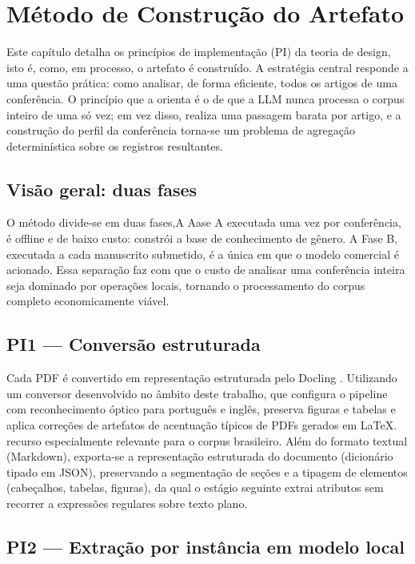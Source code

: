 


\chapter{Método de Construção do Artefato}\label{chap:Método de Construção do Artefato}

Este capítulo detalha os princípios de implementação (PI) da teoria de design, isto é, como, em processo, o artefato é construído. A estratégia central responde a uma questão prática: como analisar, de forma eficiente, todos os artigos de uma conferência. O princípio que a orienta é o de que a LLM nunca processa o corpus inteiro de uma só vez; em vez disso, realiza uma passagem barata por artigo, e a construção do perfil da conferência torna-se um problema de agregação determinística sobre os registros resultantes.

\section{Visão geral: duas fases}
O método divide-se em duas fases,A Aase A executada uma vez por conferência, é offline e de baixo custo: constrói a base de conhecimento de gênero. A Fase B, executada a cada manuscrito submetido, é a única em que o modelo comercial é acionado. Essa separação faz com que o custo de analisar uma conferência inteira seja dominado por operações locais, tornando o processamento do corpus completo economicamente viável.

\section{PI1 — Conversão estruturada}

Cada PDF é convertido em representação estruturada pelo Docling \cite{Docling}. Utilizando um conversor desenvolvido no âmbito deste trabalho, que configura o pipeline com reconhecimento óptico para português e inglês, preserva figuras e tabelas e aplica correções de artefatos de acentuação típicos de PDFs gerados em LaTeX. recurso especialmente relevante para o corpus brasileiro. Além do formato textual (Markdown), exporta-se a representação estruturada do documento (dicionário tipado em JSON), preservando a segmentação de seções e a tipagem de elementos (cabeçalhos, tabelas, figuras), da qual o estágio seguinte extrai atributos sem recorrer a expressões regulares sobre texto plano.

\section{PI2 — Extração por instância em modelo local}

